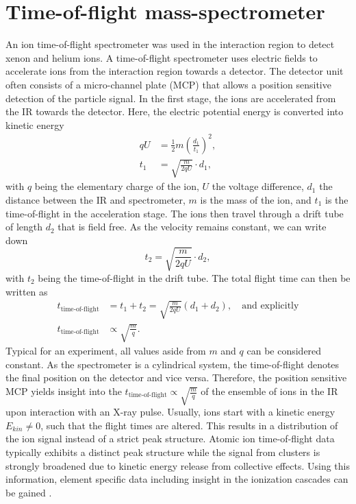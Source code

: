 \section{Time-of-flight mass-spectrometer}\label{sec:TOF-spectrometer}
An ion time-of-flight spectrometer was used in the interaction region to detect xenon and helium ions. A time-of-flight spectrometer uses electric fields to accelerate ions from the interaction region towards a detector. The detector unit often consists of a micro-channel plate (MCP) that allows a position sensitive detection of the particle signal. In the first stage, the ions are accelerated from the IR towards the detector. Here, the electric potential energy is converted into kinetic energy
\begin{align}
q U &= \frac{1}{2}m \left(\frac{d_{1}}{t_{1}}\right)^{2},\\
t_{1} &= \sqrt{\frac{m}{2qU}}\cdot d_{1},
\end{align}
with $q$ being the elementary charge of the ion, $U$ the voltage difference, $d_{1}$ the distance between the IR and spectrometer, $m$ is the mass of the ion, and $t_{1}$ is the time-of-flight in the acceleration stage. The ions then travel through a drift tube of length $d_{2}$ that is field free. As the velocity remains constant, we can write down
\begin{equation}
t_{2} = \sqrt{\frac{m}{2qU}}\cdot d_{2},
\end{equation}
with $t_{2}$ being the time-of-flight in the drift tube. The total flight time can then be written as
\begin{align}
t_{\text{time-of-flight}}&=t_{1}+t_{2}=\sqrt{\frac{m}{2 q U}} \left(d_{1}+d_{2}\right), \quad \text{and explicitly}\\
t_{\text{time-of-flight}} &\propto \sqrt{\frac{m}{q}}.
\end{align}
Typical for an experiment, all values aside from $m$ and $q$ can be considered constant. As the spectrometer is a cylindrical system, the time-of-flight denotes the final position on the detector and vice versa. Therefore, the position sensitive MCP yields insight into the $t_{\text{time-of-flight}} \propto\sqrt{\frac{m}{q}}$ of the ensemble of ions in the IR upon interaction with an X-ray pulse. Usually, ions start with a kinetic energy $E_{kin}\neq 0$, such that the flight times are altered. This results in a distribution of the ion signal instead of a strict peak structure. Atomic ion time-of-flight data typically exhibits a distinct peak structure while the signal from clusters is strongly broadened due to kinetic energy release from collective effects. Using this information, element specific data including insight in the ionization cascades can be gained \citep{Ho-2014-PRL}.\\[1\baselineskip]
